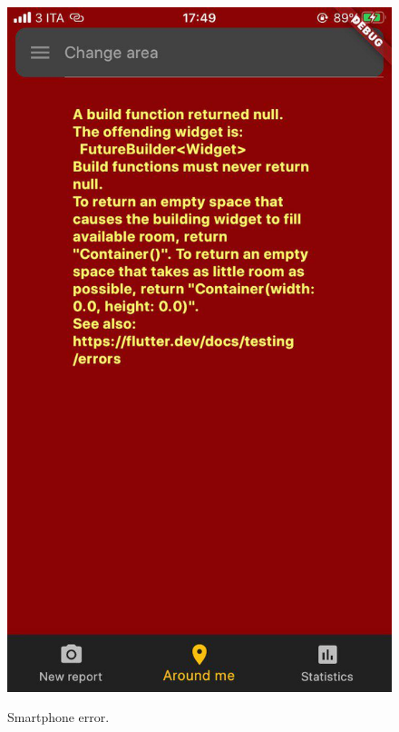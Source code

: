 \documentclass[../ATD.tex]{subfiles}
\begin{document}
    \begin{figure}[H]
        \centering
        \includegraphics[scale = 0.25]{assets/smartphone_error.png}\\
        \caption[Smartphone error]{Smartphone error.}
    \end{figure}
\end{document}
